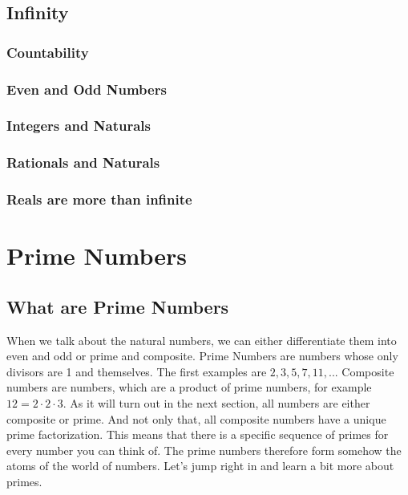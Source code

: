 \documentclass{article}
\theoremstyle{definition}
\begin{document}
\subsection{Infinity}
\subsubsection{Countability}
\subsubsection{Even and Odd Numbers}
\subsubsection{Integers and Naturals}
\subsubsection{Rationals and Naturals}
\subsubsection{Reals are more than infinite}

\newpage

\section{Prime Numbers}
\subsection{What are Prime Numbers}
When we talk about the natural numbers, we can either differentiate them into even and odd or prime and composite. Prime Numbers are numbers whose only divisors are 1 and themselves. The first examples are $2,3,5,7,11,...$ Composite numbers are numbers, which are a product of prime numbers, for example $12 = 2 \cdot 2 \cdot 3 $. As it will turn out in the next section, all numbers are either composite or prime. And not only that, all composite numbers have a unique prime factorization. This means that there is a specific sequence of primes for every number you can think of. The prime numbers therefore form somehow the atoms of the world of numbers. Let's jump right in and learn a bit more about primes.
\end{document}

